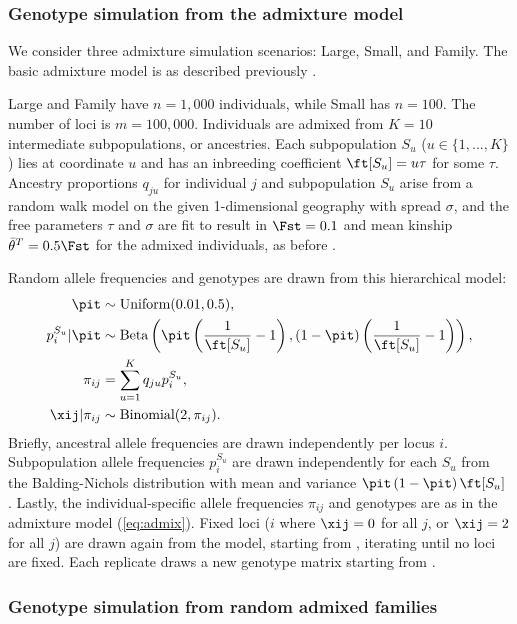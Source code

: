 \documentclass[11pt]{article}
\begin{document}
\subsubsection{Genotype simulation from the admixture model}

We consider three admixture simulation scenarios: Large, Small, and Family.
The basic admixture model is as described previously \citep{ochoa_fst1, ochoa_estimating_2021}.

Large and Family have $n = 1,000$ individuals, while Small has $n = 100$.
The number of loci is $m = 100,000$.
Individuals are admixed from $K = 10$ intermediate subpopulations, or ancestries.
Each subpopulation $S_u$ ($u \in \{ 1, ..., K \}$) lies at coordinate $u$ and has an inbreeding coefficient $\ft[S_u] = u \tau$ for some $\tau$.
Ancestry proportions $q_{ju}$ for individual $j$ and subpopulation $S_u$ arise from a random walk model on the given 1-dimensional geography with spread $\sigma$, and the free parameters $\tau$ and $\sigma$ are fit to result in $\Fst = 0.1$ and mean kinship $\bar{\theta}^T = 0.5 \Fst$ for the admixed individuals, as before \citep{ochoa_estimating_2021}.

Random allele frequencies and genotypes are drawn from this hierarchical model:
\begin{align*}
  \pit
  &\sim
    \text{Uniform}( 0.01, 0.5 )
    , \\
  p_i^{S_u} | \pit
  &\sim
    \text{Beta} \left(
    \pit \left( \frac{1}{ \ft[S_u] } - 1 \right),
    \left( 1 - \pit \right) \left( \frac{1}{ \ft[S_u] } - 1 \right)
    \right)
    , \\
  \pi_{ij}
  &=
    \sum_{u = 1}^K q_{ju} p_i^{S_u}
    , \\
  \xij | \pi_{ij}
  &\sim
    \text{Binomial}(2, \pi_{ij})
    .
\end{align*}
Briefly, ancestral allele frequencies \pit are drawn independently per locus $i$.
Subpopulation allele frequencies $p_i^{S_u}$ are drawn independently for each $S_u$ from the Balding-Nichols distribution with mean \pit and variance $\pit \left( 1 - \pit \right) \ft[S_u]$ \citep{balding_method_1995}.
Lastly, the individual-specific allele frequencies $\pi_{ij}$ and genotypes \xij are as in the admixture model (\cref{eq:admix}).
Fixed loci ($i$ where $\xij = 0$ for all $j$, or $\xij = 2$ for all $j$) are drawn again from the model, starting from \pit, iterating until no loci are fixed.
Each replicate draws a new genotype matrix starting from \pit.

\subsubsection{Genotype simulation from random admixed families}
\end{document}
